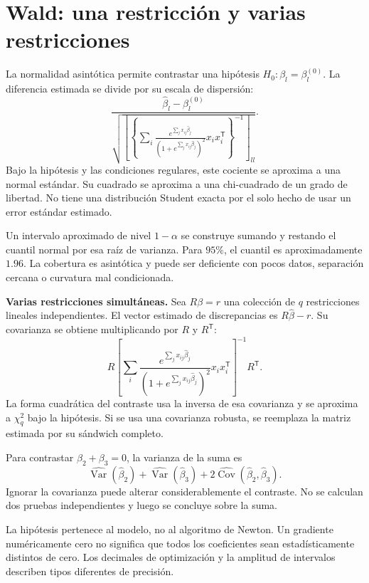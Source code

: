 \documentclass[11pt,a4paper]{article}
\newcommand{\T}{^{\mathsf T}}
\DeclareMathOperator{\Var}{Var}
\DeclareMathOperator{\Cov}{Cov}
\begin{document}
\clearpage
\section{Wald: una restricción y varias restricciones}\label{logit59}
La normalidad asintótica permite contrastar una hipótesis
$H_0:\beta_l=\beta_l^{(0)}$.
La diferencia estimada se divide por su escala de dispersión:
\[
\frac{\widehat\beta_l-\beta_l^{(0)}}
{\sqrt{\left[
\left\{\sum_i
\frac{e^{\sum_jx_{ij}\widehat\beta_j}}
{(1+e^{\sum_jx_{ij}\widehat\beta_j})^2}x_ix_i\T
\right\}^{-1}\right]_{ll}}}.
\]
Bajo la hipótesis y las condiciones regulares, este cociente
se aproxima a una normal estándar.
Su cuadrado se aproxima a una chi-cuadrado de un grado de libertad.
No tiene una distribución Student exacta por el solo hecho de
usar un error estándar estimado.

Un intervalo aproximado de nivel $1-\alpha$ se construye
sumando y restando el cuantil normal por esa raíz de varianza.
Para $95\%$, el cuantil es aproximadamente $1.96$.
La cobertura es asintótica y puede ser deficiente con pocos
datos, separación cercana o curvatura mal condicionada.

\textbf{Varias restricciones simultáneas.}
Sea $R\beta=r$ una colección de $q$ restricciones lineales
independientes.
El vector estimado de discrepancias es $R\widehat\beta-r$.
Su covarianza se obtiene multiplicando por $R$ y $R\T$:
\[
R\left[
\sum_i\frac{e^{\sum_jx_{ij}\widehat\beta_j}}
{(1+e^{\sum_jx_{ij}\widehat\beta_j})^2}x_ix_i\T
\right]^{-1}R\T.
\]
La forma cuadrática del contraste usa la inversa de esa
covarianza y se aproxima a $\chi^2_q$ bajo la hipótesis.
Si se usa una covarianza robusta, se reemplaza la matriz
estimada por su sándwich completo.

\begin{ejemplo}
Para contrastar $\beta_2+\beta_3=0$, la varianza de la suma es
\[
\widehat{\Var}(\widehat\beta_2)
+\widehat{\Var}(\widehat\beta_3)
+2\widehat{\Cov}(\widehat\beta_2,\widehat\beta_3).
\]
Ignorar la covarianza puede alterar considerablemente el contraste.
No se calculan dos pruebas independientes y luego se
concluye sobre la suma.
\end{ejemplo}
La hipótesis pertenece al modelo, no al algoritmo de Newton.
Un gradiente numéricamente cero no significa que todos
los coeficientes sean estadísticamente distintos de cero.
Los decimales de optimización y la amplitud de intervalos
describen tipos diferentes de precisión.

\clearpage
\end{document}
